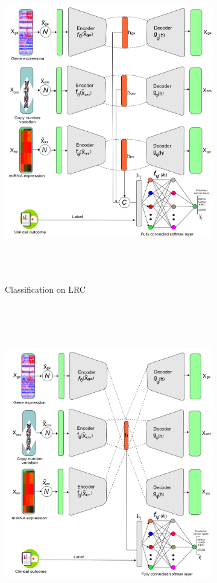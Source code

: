 \begin{figure}
	\centering
	\begin{subfigure}{.48\linewidth}
		\centering
		\includegraphics[width=\linewidth,height=140mm]{images/lrc_cls.png}
		\caption{Classification on LRC}
        \label{fig:lrc_11}
	\end{subfigure}
	\hfill
	\begin{subfigure}{0.48\linewidth}
		\centering
		\includegraphics[width=\linewidth,height=140mm]{images/joint_rl_cls.png}

\end{subfigure}
\end{figure}
